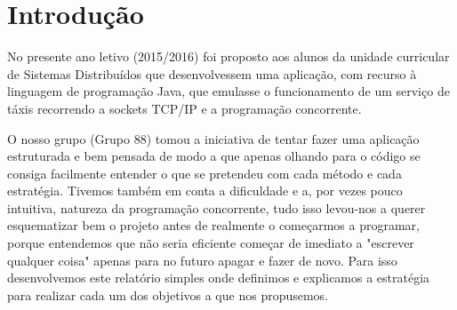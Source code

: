 \chapter*{Introdução} 

No presente ano letivo (2015/2016) foi proposto aos alunos da unidade curricular de Sistemas Distribuídos que desenvolvessem uma aplicação, com recurso à linguagem de programação Java, que emulasse o funcionamento de um serviço de táxis recorrendo a sockets TCP/IP e a programação concorrente.

O nosso grupo (Grupo 88) tomou a iniciativa de tentar fazer uma aplicação estruturada e bem pensada de modo a que apenas olhando para o código se consiga facilmente entender o que se pretendeu com cada método e cada estratégia. Tivemos também em conta a dificuldade e a, por vezes pouco intuitiva, natureza da programação concorrente, tudo isso levou-nos a querer esquematizar bem o projeto antes de realmente o começarmos a programar, porque entendemos que não seria eficiente começar de imediato a "escrever qualquer coisa" apenas para no futuro apagar e fazer de novo. Para isso desenvolvemos este relatório simples onde definimos e explicamos a estratégia para realizar cada um dos objetivos a que nos propusemos.  









